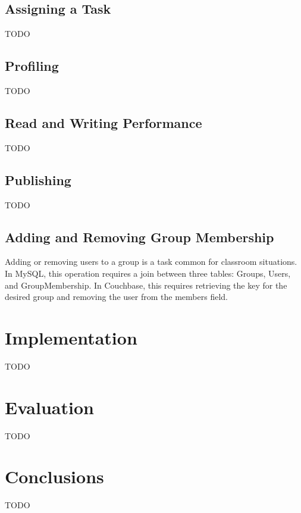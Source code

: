 \documentclass[]{IEEEtran}
\begin{document}
\subsection{Assigning a Task}
TODO
\subsection{Profiling}
TODO
\subsection{Read and Writing Performance}
TODO
\subsection{Publishing}
TODO
\subsection{Adding and Removing Group Membership}
Adding or removing users to a group is a task common for classroom situations. In MySQL, this operation requires a join between three tables: Groups, Users, and GroupMembership. In Couchbase, this requires retrieving the key for the desired group and removing the user from the members field.

\section{Implementation}
TODO

\section{Evaluation}
TODO

\section{Conclusions}
TODO

% 
% 
\end{document}
